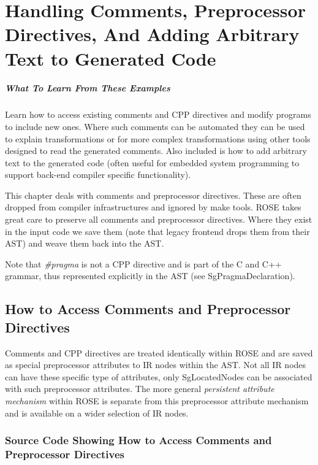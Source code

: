 \chapter{Handling Comments, Preprocessor Directives, And Adding Arbitrary Text to Generated Code}

\paragraph{What To Learn From These Examples}
Learn how to access existing comments and CPP directives
and modify programs to include new ones. Where such comments 
can be automated they can be used to explain transformations 
or for more complex transformations using other tools
designed to read the generated comments.  Also included is
how to add arbitrary text to the generated code (often useful
for embedded system programming to support back-end compiler 
specific functionality).

   This chapter deals with comments and preprocessor directives.
These are often dropped from compiler infrastructures and ignored
by make tools.  ROSE takes great care to preserve all comments and
preprocessor directives.  Where they exist in the input code we 
save them (note that legacy frontend drops them from their AST) and weave them
back into the AST.  

Note that {\it \#pragma} is not a CPP directive and is part of the
C and C++ grammar, thus represented explicitly in the AST (see SgPragmaDeclaration).

\section{How to Access Comments and Preprocessor Directives}

   Comments and CPP directives are treated identically within ROSE and are 
saved as special preprocessor attributes to IR nodes within the AST.
Not all IR nodes can have these specific type of attributes, only 
SgLocatedNodes can be associated with such preprocessor attributes.
The more general {\it persistent attribute mechanism} within ROSE is separate from this
preprocessor attribute mechanism and is available on a wider selection of IR nodes.

\subsection{Source Code Showing How to Access Comments and Preprocessor Directives}

